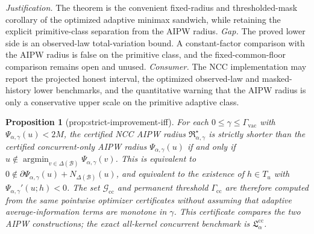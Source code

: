 \documentclass{article}
\newtheorem{proposition}{Proposition}
\begin{document}
\par\smallskip\noindent \textit{Justification.} The theorem is the convenient fixed-radius and thresholded-mask corollary of the optimized adaptive minimax sandwich, while retaining the explicit primitive-class separation from the AIPW radius. \textit{Gap.} The proved lower side is an observed-law total-variation bound. A constant-factor comparison with the AIPW radius is false on the primitive class, and the fixed-common-floor comparison remains open and unused. \textit{Consumer.} The NCC implementation may report the projected honest interval, the optimized observed-law and masked-history lower benchmarks, and the quantitative warning that the AIPW radius is only a conservative upper scale on the primitive adaptive class.

\begin{proposition}[prop:strict-improvement-iff]\label{prop:strict-improvement-iff}
For each \(0\le\gamma\le\Gamma_{\mathrm{vac}}\) with \(\Psi_{\alpha,\gamma}(u)<2M\), the certified NCC AIPW radius \(\mathfrak R_{\alpha,\gamma}^\star\) is strictly shorter than the certified concurrent-only AIPW radius \(\Psi_{\alpha,\gamma}(u)\) if and only if \(u\notin\operatorname*{argmin}_{v\in\Delta(\mathcal B)}\Psi_{\alpha,\gamma}(v)\). This is equivalent to \(0\notin\partial\Psi_{\alpha,\gamma}(u)+N_{\Delta(\mathcal B)}(u)\), and equivalent to the existence of \(h\in T_u\) with \(\Psi_{\alpha,\gamma}'(u;h)<0\). The set \(\mathcal G_{\mathrm{cc}}\) and permanent threshold \(\Gamma_{\mathrm{cc}}\) are therefore computed from the same pointwise optimizer certificates without assuming that adaptive average-information terms are monotone in \(\gamma\). This certificate compares the two AIPW constructions; the exact all-kernel concurrent benchmark is \(\mathfrak L_\alpha^{\mathrm{cc}}\).
\end{proposition}
\end{document}
